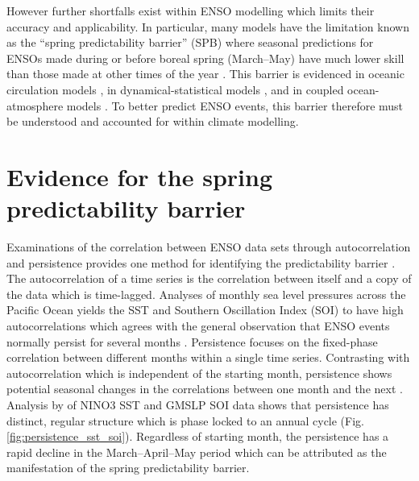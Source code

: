 \documentclass[12pt, onecolumn]{revtex4}    %
\begin{document}
However further shortfalls exist within ENSO modelling which limits their accuracy and applicability. In particular, many models have the limitation known as the ``spring predictability barrier'' (SPB) where seasonal predictions for ENSOs made during or before boreal spring (March--May) have much lower skill than those made at other times of the year \citep{torrence1998annual}. This barrier is evidenced in oceanic circulation models \citep{latif1992much}, in dynamical-statistical models \citep{balmaseda1994enso}, and in coupled ocean-atmosphere models \citep{goswami1991predictability, xue1994prediction}. To better predict ENSO events, this barrier therefore must be understood and accounted for within climate modelling.

\section{Evidence for the spring predictability barrier}
\noindent
Examinations of the correlation between ENSO data sets through autocorrelation and persistence provides one method for identifying the predictability barrier \citep{torrence1998annual}. The autocorrelation of a time series is the correlation between itself and a copy of the data which is time-lagged. Analyses of monthly sea level pressures across the Pacific Ocean yields the SST and Southern Oscillation Index (SOI) to have high autocorrelations which agrees with the general observation that ENSO events normally persist for several months \citep{trenberth1976spatial}. Persistence focuses on the fixed-phase correlation between different months within a single time series. Contrasting with autocorrelation which is independent of the starting month, persistence shows potential seasonal changes in the correlations between one month and the next \citep{troup1965southern}. Analysis by \cite{torrence1998annual} of NINO3 SST and GMSLP SOI data shows that persistence has distinct, regular structure which is phase locked to an annual cycle (Fig. \ref{fig:persistence_sst_soi}). Regardless of starting month, the persistence has a rapid decline in the March--April--May period which can be attributed as the manifestation of the spring predictability barrier. \\
\end{document}
